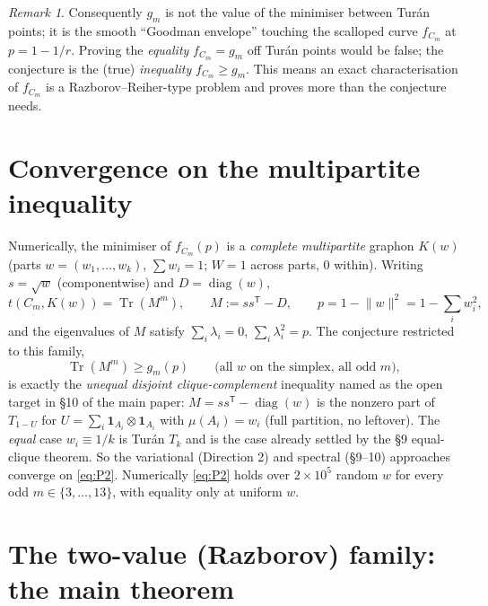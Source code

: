 \documentclass[11pt]{article}
\theoremstyle{remark}
\newtheorem{remark}[theorem]{Remark}
\newcommand{\one}{\mathbf 1}
\newcommand{\Tr}{\operatorname{Tr}}
\newcommand{\norm}[1]{\lVert #1\rVert}
\begin{document}
\begin{remark}
Consequently $g_m$ is not the value of the minimiser between Tur\'an points; it is the smooth ``Goodman envelope'' touching the scalloped curve $f_{C_m}$ at $p=1-1/r$.  Proving the \emph{equality} $f_{C_m}=g_m$ off Tur\'an points would be false; the conjecture is the (true) \emph{inequality} $f_{C_m}\ge g_m$.  This means an exact characterisation of $f_{C_m}$ is a Razborov--Reiher-type problem and proves more than the conjecture needs.
\end{remark}

\section{Convergence on the multipartite inequality}\label{sec:multipartite}

Numerically, the minimiser of $f_{C_m}(p)$ is a \emph{complete multipartite} graphon $K(w)$ (parts $w=(w_1,\dots,w_k)$, $\sum w_i=1$; $W=1$ across parts, $0$ within).  Writing $s=\sqrt w$ (componentwise) and $D=\operatorname{diag}(w)$,
\begin{equation}\label{eq:Mform}
        t(C_m,K(w))=\Tr(M^m),\qquad M:=ss^{\mathsf T}-D,\qquad p=1-\norm w^2=1-\textstyle\sum_i w_i^2,
\end{equation}
and the eigenvalues of $M$ satisfy $\sum_i\lambda_i=0$, $\sum_i\lambda_i^2=p$.  The conjecture restricted to this family,
\begin{equation}\label{eq:P2}
        \Tr(M^m)\ge g_m(p)\qquad\text{(all }w\text{ on the simplex, all odd }m\text{)},\tag{P2}
\end{equation}
is exactly the \emph{unequal disjoint clique-complement} inequality named as the open target in \S10 of the main paper: $M=ss^{\mathsf T}-\operatorname{diag}(w)$ is the nonzero part of $T_{1-U}$ for $U=\sum_i\one_{A_i}\otimes\one_{A_i}$ with $\mu(A_i)=w_i$ (full partition, no leftover).  The \emph{equal} case $w_i\equiv1/k$ is Tur\'an $T_k$ and is the case already settled by the \S9 equal-clique theorem.  So the variational (Direction 2) and spectral (\S9--10) approaches converge on \eqref{eq:P2}.  Numerically \eqref{eq:P2} holds over $2\times10^5$ random $w$ for every odd $m\in\{3,\dots,13\}$, with equality only at uniform $w$.

\section{The two-value (Razborov) family: the main theorem}\label{sec:twovalue}
\end{document}
